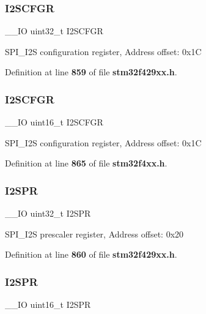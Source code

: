 \subsubsection{I2\+S\+C\+F\+GR\hspace{0.1cm}{\footnotesize\ttfamily [1/2]}}
{\footnotesize\ttfamily \+\_\+\+\_\+\+IO uint32\+\_\+t I2\+S\+C\+F\+GR}

S\+P\+I\+\_\+\+I2S configuration register, Address offset\+: 0x1C 

Definition at line \textbf{ 859} of file \textbf{ stm32f429xx.\+h}.

\mbox{\label{structSPI__TypeDef_acb40abca5ca4cd2b2855adf2186effe8}} 
\subsubsection{I2\+S\+C\+F\+GR\hspace{0.1cm}{\footnotesize\ttfamily [2/2]}}
{\footnotesize\ttfamily \+\_\+\+\_\+\+IO uint16\+\_\+t I2\+S\+C\+F\+GR}

S\+P\+I\+\_\+\+I2S configuration register, Address offset\+: 0x1C 

Definition at line \textbf{ 865} of file \textbf{ stm32f4xx.\+h}.

\mbox{\label{structSPI__TypeDef_ab9be89a916ee5904381e10da10e5e8e9}} 
\subsubsection{I2\+S\+PR\hspace{0.1cm}{\footnotesize\ttfamily [1/2]}}
{\footnotesize\ttfamily \+\_\+\+\_\+\+IO uint32\+\_\+t I2\+S\+PR}

S\+P\+I\+\_\+\+I2S prescaler register, Address offset\+: 0x20 

Definition at line \textbf{ 860} of file \textbf{ stm32f429xx.\+h}.

\mbox{\label{structSPI__TypeDef_a02ce1ece243cc4ce1d66ebeca247fee1}} 
\subsubsection{I2\+S\+PR\hspace{0.1cm}{\footnotesize\ttfamily [2/2]}}
{\footnotesize\ttfamily \+\_\+\+\_\+\+IO uint16\+\_\+t I2\+S\+PR}

